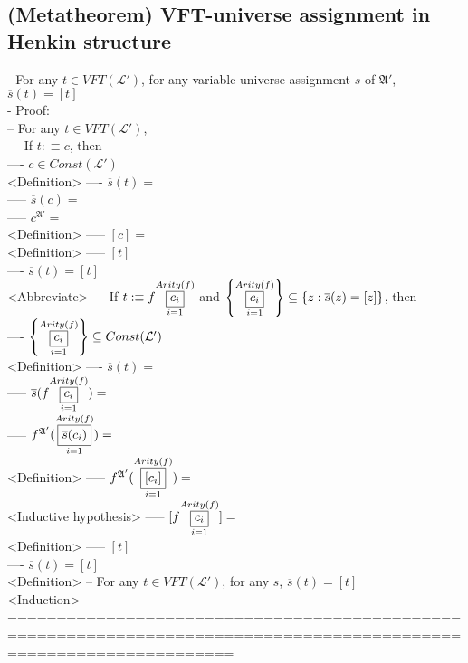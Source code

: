 \documentclass{book}
\newcommand{\is}{:\equiv}
\newcommand{\means}[2]{#1^{#2}}
\newcommand{\extend}[1]{\overline{#1}}
\newcommand{\set}[1]{\left\{ #1 \right\}}
\newcommand{\vdc}[3]{\underset{#2}{\overset{#3}{\fbox{$#1$}}}}
\begin{document}
\subsection{(Metatheorem) VFT-universe assignment in Henkin structure} %
	- For any $t \in VFT(\mathcal{L}')$, for any variable-universe assignment $s$ of $\mathfrak{A}'$, $\extend{s}(t) = [t]$ \\
	- Proof: \\
		-- For any $t \in VFT(\mathcal{L}')$, \\
			--- If $t \is c$, then \\
				---- $c \in Const(\mathcal{L}')$ \\ <Definition>
				---- $\extend{s}(t) = $ \\
					----- $\extend{s}(c) = $ \\
					----- $\means{c}{\mathfrak{A}'} = $ \\ <Definition>
					----- $[c] = $ \\ <Definition>
					----- $[t]$ \\
				---- $\extend{s}(t) = [t]$ \\ <Abbreviate>
			--- If $t \is f \vdc{c_i}{i=1}{Arity(f)}$ and $\set{\vdc{c_i}{i=1}{Arity(f)}} \subseteq \set{z: \extend{s}(z) = [z]}$, then \\
				---- $\set{\vdc{c_i}{i=1}{Arity(f)}} \subseteq Const(\mathcal{L}')$ \\ <Definition>
				---- $\extend{s}(t) = $ \\
					----- $\extend{s}(f \vdc{c_i}{i=1}{Arity(f)}) = $ \\
					----- $\means{f}{\mathfrak{A}'}(\vdc{\extend{s}(c_i)}{i=1}{Arity(f)}) = $ \\ <Definition>
					----- $\means{f}{\mathfrak{A}'}(\vdc{[c_i]}{i=1}{Arity(f)}) = $ \\ <Inductive hypothesis>
					----- $[f \vdc{c_i}{i=1}{Arity(f)}] = $ \\ <Definition>
					----- $[t]$ \\
				---- $\extend{s}(t) = [t]$ \\ <Definition>
		-- For any $t \in VFT(\mathcal{L}')$, for any $s$, $\extend{s}(t) = [t]$ \\ <Induction>
	===================================================================================================================
\end{document}
